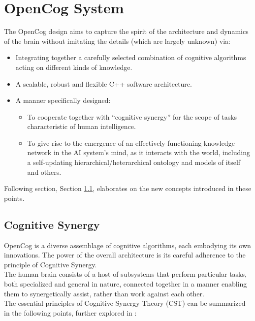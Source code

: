 \chapter{OpenCog System} \label{cha:opencog_system}

The OpenCog design aims to capture the spirit of the architecture and dynamics of the brain without imitating the details (which are largely unknown) via:
\begin{itemize}
	\item Integrating together a carefully selected combination of cognitive algorithms acting on different kinds of knowledge.
	\item A scalable, robust and flexible C++ software architecture.
	\item A manner specifically designed:
	\begin{itemize}	
	\item To cooperate together with “cognitive synergy” for the scope of tasks characteristic of human intelligence. 
	\item To give rise to the emergence of an effectively functioning knowledge network in the AI system’s mind, as it interacts with the world, including a self-updating hierarchical/heterarchical ontology and models of itself and others.
	\end{itemize}
\end{itemize}
Following section, Section \ref{sec:cognitive_synergy}, elaborates on the new concepts introduced in these points.


\section{Cognitive Synergy}\label{sec:cognitive_synergy}

OpenCog is a diverse assemblage of cognitive algorithms, each embodying its own innovations. The power of the overall architecture is its careful adherence to the principle of Cognitive Synergy. \\
The human brain consists of a host of subsystems that perform particular tasks, both specialized and general in nature, connected together in a manner enabling them to synergetically assist, rather than work against each other. \\
The essential principles of Cognitive Synergy Theory (CST) can be summarized in the following points, further explored in \cite{inproceedings_cognitive_synergy}:

